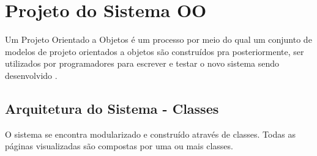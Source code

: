
\chapter{Projeto do Sistema OO}

Um Projeto Orientado a Objetos é um processo por meio do qual um conjunto de modelos de projeto orientados a objetos são construídos pra posteriormente, ser utilizados por programadores para escrever e testar o novo sistema sendo desenvolvido \cite{Satzinger2012}.

\section{Arquitetura do Sistema - Classes}
    O sistema se encontra modularizado e construído através de classes. Todas as páginas visualizadas são compostas por uma ou mais classes.
    
